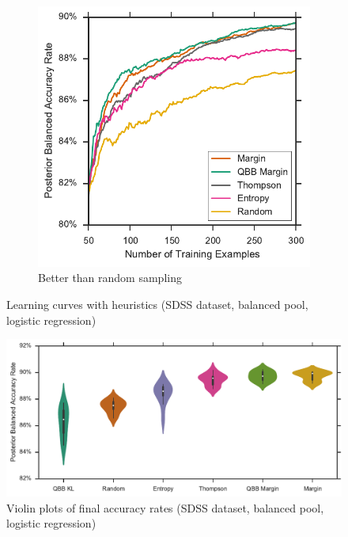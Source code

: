 \begin{figure}[p]
\begin{subfigure}{.5\textwidth}
		\includegraphics[width=0.99\linewidth]{figures/5_active/sdss_bl_ind_upper}
		\caption{Better than random sampling}
		\label{fig:sdss_bl_ind_upper}
	\end{subfigure}
	\caption[Learning curves with heuristics (SDSS, balanced, logistic)]{
		Learning curves with heuristics (SDSS dataset, balanced pool, logistic regression)}
	\label{fig:sdss_bl_ind}
\end{figure}

\begin{figure}[p]
	\centering
	\includegraphics[width=\textwidth]{figures/5_active/sdss_bl_ind_violin}
	\caption[Violin plots of final accuracy rates (SDSS, balanced, logistic)]{
		Violin plots of final accuracy rates (SDSS dataset, balanced pool, logistic regression)}
	\label{fig:sdss_bl_ind_violin}
\end{figure}

